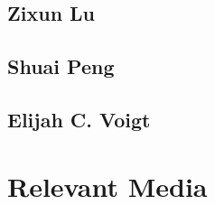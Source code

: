 \subsection{Zixun Lu}



\subsection{Shuai Peng}



\subsection{Elijah C. Voigt}



\section{Relevant Media}

\printbibliography


